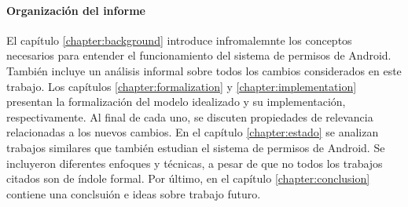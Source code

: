 \paragraph{Organización del informe}
El capítulo \ref{chapter:background} introduce infromalemnte los conceptos necesarios para entender
el funcionamiento del sistema de permisos de Android. También incluye un análisis informal sobre
todos los cambios considerados en este trabajo. Los capítulos \ref{chapter:formalization} y
\ref{chapter:implementation} presentan la formalización del modelo idealizado y su implementación,
respectivamente. Al final de cada uno, se discuten propiedades de relevancia relacionadas a los
nuevos cambios. En el capítulo \ref{chapter:estado} se analizan trabajos similares que también
estudian el sistema de permisos de Android. Se incluyeron diferentes enfoques y técnicas, a pesar de
que no todos los trabajos citados son de índole formal. Por último, en el capítulo
\ref{chapter:conclusion} contiene una conclsuión e ideas sobre trabajo futuro.